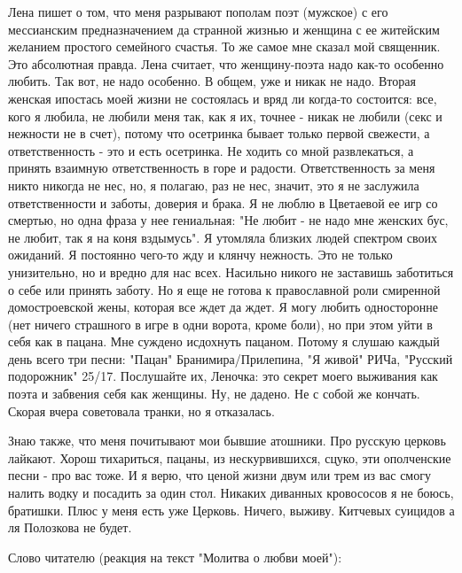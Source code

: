 Лена пишет о том, что меня разрывают пополам поэт (мужское) с его мессианским
предназначением да странной жизнью и женщина с ее житейским желанием простого
семейного счастья. То же самое мне сказал мой священник. Это абсолютная правда.
Лена считает, что женщину-поэта надо как-то особенно любить. Так вот, не надо
особенно. В общем, уже и никак не надо. Вторая женская ипостась моей жизни не
состоялась и вряд ли когда-то состоится: все, кого я любила, не любили меня
так, как я их, точнее - никак не любили (секс и нежности не в счет), потому что
осетринка бывает только первой свежести, а ответственность - это и есть
осетринка. Не ходить со мной развлекаться, а принять взаимную ответственность в
горе и радости. Ответственность за меня никто никогда не нес, но, я полагаю,
раз не нес, значит, это я не заслужила ответственности и заботы, доверия и
брака. Я не люблю в Цветаевой ее игр со смертью, но одна фраза у нее
гениальная: "Не любит - не надо мне женских бус, не любит, так я на коня
вздымусь". Я утомляла близких людей спектром своих ожиданий. Я постоянно
чего-то жду и клянчу нежность. Это не только унизительно, но и вредно для нас
всех. Насильно никого не заставишь заботиться о себе или принять заботу. Но я
еще не готова к православной роли смиренной домостроевской жены, которая все
ждет да ждет. Я могу любить односторонне (нет ничего страшного в игре в одни
ворота, кроме боли), но при этом уйти в себя как в пацана. Мне суждено
исдохнуть пацаном. Потому я слушаю каждый день всего три песни: "Пацан"
Бранимира/Прилепина, "Я живой" РИЧа, "Русский подорожник" 25/17. Послушайте их,
Леночка: это секрет моего выживания как поэта и забвения себя как женщины. Ну,
не дадено. Не с собой же кончать. Скорая вчера советовала транки, но я
отказалась. 

Знаю также, что меня почитывают мои бывшие атошники. Про русскую церковь
лайкают. Хорош тихариться, пацаны, из нескурвившихся, сцуко, эти ополченские
песни - про вас тоже. И я верю, что ценой жизни двум или трем из вас смогу
налить водку и посадить за один стол. Никаких диванных кровососов я не боюсь,
братишки. Плюс у меня есть уже Церковь. Ничего, выживу. Китчевых суицидов а ля
Полозкова не будет.

Слово читателю (реакция на текст "Молитва о любви моей"):

